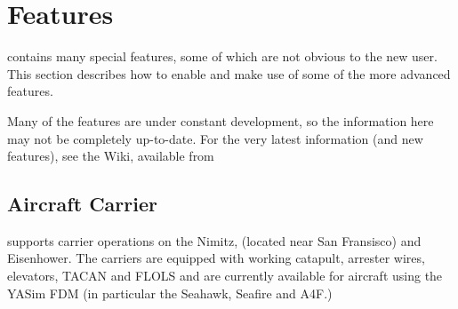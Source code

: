 
\chapter{Features\label{features}}

\FlightGear{} contains many special features, some of which are not obvious to the new user. This section
describes how to enable and make use of some of the more advanced features. 

Many of the features are under constant development, so the information here may not be completely up-to-date.
For the very latest information (and new features), see the \FlightGear{} Wiki, available from

\noindent
{}

\section{Aircraft Carrier}

\FlightGear{} supports carrier operations on the Nimitz, (located near San Fransisco) and Eisenhower. 
The carriers are equipped with working catapult, arrester wires, elevators, TACAN and FLOLS and 
are currently available for aircraft using the YASim FDM (in particular the Seahawk, Seafire and A4F.)

